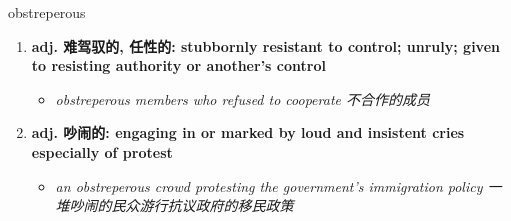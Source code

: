 
\begin{frame}
{\huge obstreperous}
\begin{center}
\begin{enumerate}\Large
  \item \textbf{adj. 难驾驭的, 任性的: stubbornly resistant to control; unruly; given to resisting authority or another's control}
  \begin{itemize}
    \item \em{\Large{obstreperous members who refused to cooperate 不合作的成员}}
  \end{itemize}
  \item \textbf{adj. 吵闹的: engaging in or marked by loud and insistent cries especially of protest}
  \begin{itemize}
    \item \em{\Large{an obstreperous crowd protesting the government's immigration policy 一堆吵闹的民众游行抗议政府的移民政策}}
  \end{itemize}
\end{enumerate}
\end{center}
\end{frame}
